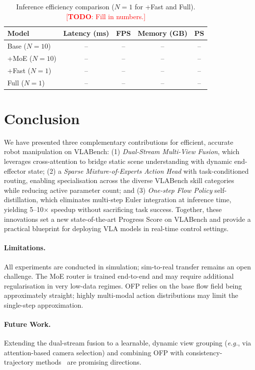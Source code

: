 \documentclass[10pt,twocolumn]{article}
\newcommand{\eg}{\textit{e.g.}}
\newcommand{\TODO}[1]{\textcolor{red}{[\textbf{TODO}: #1]}}
\begin{document}
\begin{table}[h]
  \centering
  \caption{Inference efficiency comparison ($N{=}1$ for +Fast and Full).
    \TODO{Fill in numbers.}}
  \label{tab:efficiency}
  \begin{tabular}{lcccc}
    \toprule
    Model & Latency (ms) & FPS & Memory (GB) & PS \\
    \midrule
    Base  ($N{=}10$) & -- & -- & -- & -- \\
    +MoE  ($N{=}10$) & -- & -- & -- & -- \\
    +Fast ($N{=}1$)  & -- & -- & -- & -- \\
    Full  ($N{=}1$)  & -- & -- & -- & -- \\
    \bottomrule
  \end{tabular}
\end{table}


\section{Conclusion}
\label{sec:conclusion}

We have presented three complementary contributions for efficient, accurate
robot manipulation on VLABench:
(1) \emph{Dual-Stream Multi-View Fusion}, which leverages cross-attention to
    bridge static scene understanding with dynamic end-effector state;
(2) a \emph{Sparse Mixture-of-Experts Action Head} with task-conditioned
    routing, enabling specialisation across the diverse VLABench skill
    categories while reducing active parameter count; and
(3) \emph{One-step Flow Policy} self-distillation, which eliminates
    multi-step Euler integration at inference time, yielding 5--10$\times$
    speedup without sacrificing task success.
Together, these innovations set a new state-of-the-art Progress Score on
VLABench and provide a practical blueprint for deploying VLA models in
real-time control settings.

\paragraph{Limitations.}
All experiments are conducted in simulation; sim-to-real transfer remains
an open challenge.
The MoE router is trained end-to-end and may require additional regularisation
in very low-data regimes.
OFP relies on the base flow field being approximately straight; highly
multi-modal action distributions may limit the single-step approximation.

\paragraph{Future Work.}
Extending the dual-stream fusion to a learnable, dynamic view grouping
(\eg, via attention-based camera selection) and combining OFP with
consistency-trajectory methods~\cite{song2023consistency} are promising
directions.




\end{document}
